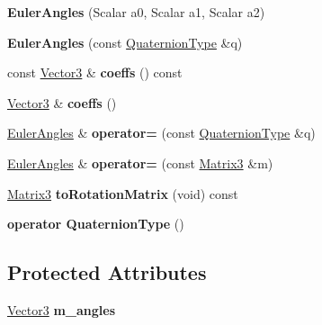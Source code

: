 \begin{DoxyCompactItemize}
{\bfseries Euler\+Angles} (Scalar a0, Scalar a1, Scalar a2)
\item 
\mbox{\label{class_euler_angles_acd4096f3d77cb63a57ffaaf494606f94}} 
{\bfseries Euler\+Angles} (const \hyperlink{group___geometry___module_class_eigen_1_1_quaternion}{Quaternion\+Type} \&q)
\item 
\mbox{\label{class_euler_angles_a393c0dfb2c025f3c8e62e517803e3b8c}} 
const \hyperlink{group___core___module}{Vector3} \& {\bfseries coeffs} () const
\item 
\mbox{\label{class_euler_angles_a7000f149f7e8b0c1c18a559021771bb9}} 
\hyperlink{group___core___module}{Vector3} \& {\bfseries coeffs} ()
\item 
\mbox{\label{class_euler_angles_a1eee54f4ee3b2fddc8e463a95a654575}} 
\hyperlink{class_eigen_1_1_euler_angles}{Euler\+Angles} \& {\bfseries operator=} (const \hyperlink{group___geometry___module_class_eigen_1_1_quaternion}{Quaternion\+Type} \&q)
\item 
\mbox{\label{class_euler_angles_a205606bcdcfc9ae5cd0d82d54f8639ed}} 
\hyperlink{class_eigen_1_1_euler_angles}{Euler\+Angles} \& {\bfseries operator=} (const \hyperlink{group___core___module_class_eigen_1_1_matrix}{Matrix3} \&m)
\item 
\mbox{\label{class_euler_angles_a4757b31c441ff9e5b75d2e24f9bea545}} 
\hyperlink{group___core___module_class_eigen_1_1_matrix}{Matrix3} {\bfseries to\+Rotation\+Matrix} (void) const
\item 
\mbox{\label{class_euler_angles_a485da08548c361bbe1a9d62715c8e0eb}} 
{\bfseries operator Quaternion\+Type} ()
\end{DoxyCompactItemize}
\subsection*{Protected Attributes}
\begin{DoxyCompactItemize}
\item 
\mbox{\label{class_euler_angles_ae880c0a0016e316139a3b0da63f7cc8c}} 
\hyperlink{group___core___module}{Vector3} {\bfseries m\+\_\+angles}
\end{DoxyCompactItemize}


